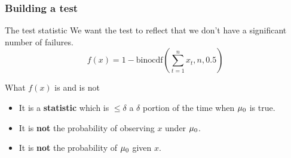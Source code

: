 \begin{frame}
  \frametitle{Building a test}
  \begin{block}{The test statistic}
    We want the test to reflect that we don't have a significant number of failures.
    \[
      f(x) = 1 - \textrm{binocdf}(\sum_{t=1}^n x_t, n, 0.5)
    \]
  \end{block}
  \begin{alertblock}{What $f(x)$ is and is not}
    \begin{itemize}
    \item It is a \textbf{statistic} which is $\leq \delta$ a $\delta$ portion of the time when $\mu_0$ is true.
    \item It is \textbf{not} the probability of observing $x$ under $\mu_0$.
    \item It is \textbf{not} the probability of $\mu_0$ given $x$.
    \end{itemize}
  \end{alertblock}
\end{frame}
